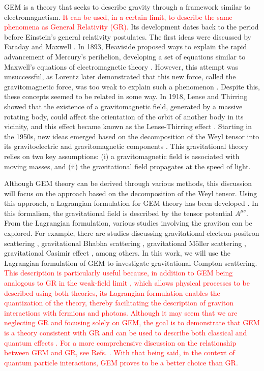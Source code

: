 \documentclass[11pt,showpacs,preprintnumbers,amsmath,amssymb,prd,nofootinbib,superscriptaddress]{revtex4-2}
\begin{document}
GEM is a theory that seeks to describe gravity through a framework similar to electromagnetism. \textcolor{red}{It can be used, in a certain limit, to describe the same phenomena as General Relativity (GR).} Its development dates back to the period before Einstein's general relativity postulates. The first ideas were discussed by Faraday \cite{Faraday} and Maxwell \cite{Maxwell}. In 1893, Heaviside proposed ways to explain the rapid advancement of Mercury's perihelion, developing a set of equations similar to Maxwell's equations of electromagnetic theory \cite{heaviside1893gravitational}. However, this attempt was unsuccessful, as Lorentz later demonstrated that this new force, called the gravitomagnetic force, was too weak to explain such a phenomenon \cite{lorentz1899considerations}. Despite this, these concepts seemed to be related in some way. In 1918, Lense and Thirring showed that the existence of a gravitomagnetic field, generated by a massive rotating body, could affect the orientation of the orbit of another body in its vicinity, and this effect became known as the Lense-Thirring effect \cite{LT}. Starting in the 1950s, new ideas emerged based on the decomposition of the Weyl tensor into its gravitoelectric and gravitomagnetic components \cite{matte1953nouvelles, bel1958radiation}. This gravitational theory relies on two key assumptions: (i) a gravitomagnetic field is associated with moving masses, and (ii) the gravitational field propagates at the speed of light. 

Although GEM theory can be derived through various methods, this discussion will focus on the approach based on the decomposition of the Weyl tensor. Using this approach, a Lagrangian formulation for GEM theory has been developed \cite{Jair}. In this formalism, the gravitational field is described by the tensor potential $A^{\mu\nu}$. From the Lagrangian formulation, various studies involving the graviton can be explored. For example, there are studies discussing gravitational electron-positron scattering \cite{jesus2022gravitational}, gravitational Bhabha scattering \cite{santos2017gravitational}, gravitational M\"{o}ller scattering \cite{alesandrogravitacional}, gravitational Casimir effect \cite{Casimir}, among others. In this work, we will use the Lagrangian formulation of GEM to investigate gravitational Compton scattering. \textcolor{red}{This description is particularly useful because, in addition to GEM being analogous to GR in the weak-field limit \cite{Mashhon}, which allows physical processes to be described using both theories, its Lagrangian formulation enables the quantization of the theory, thereby facilitating the description of graviton interactions with fermions and photons. Although it may seem that we are neglecting GR and focusing solely on GEM, the goal is to demonstrate that GEM is a theory consistent with GR and can be used to describe both classical and quantum effects \cite{santos2017gravitational, farrugia2020gravitoelectromagnetism, chatzistavrakidis2020torsion}. For a more comprehensive discussion on the relationship between GEM and GR, see Refs. \cite{alesandrogravitacional,Mashhon,bakopoulos2016gravitoelectromagnetism}. With that being said, in the context of quantum particle interactions, GEM proves to be a better choice than GR.}
\end{document}
